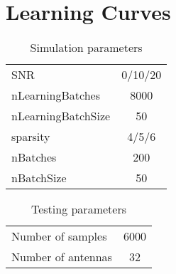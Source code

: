 \documentclass[a4paper,conference]{IEEEtran}
\begin{document}
\section{Learning Curves}



\clearpage
\begin{table}[!hb]
	\centering
	\caption{Simulation parameters}
	\begin{tabular}{|l|c|}
	\hline
	SNR 					& 0/10/20 \\
	nLearningBatches 		& 8000 \\
	nLearningBatchSize 		& 50 \\
	sparsity 				& 4/5/6 \\
	nBatches   				& 200 \\
	nBatchSize 				& 50 \\
	\hline
	\end{tabular}
\end{table}
\begin{table}[!hb]
	\centering
	\caption{Testing parameters}
	\begin{tabular}{|l|c|}
	\hline
	Number of samples       & 6000 \\
	Number of antennas 		& 32 \\
	\hline
	\end{tabular}
\end{table}
\end{document}

